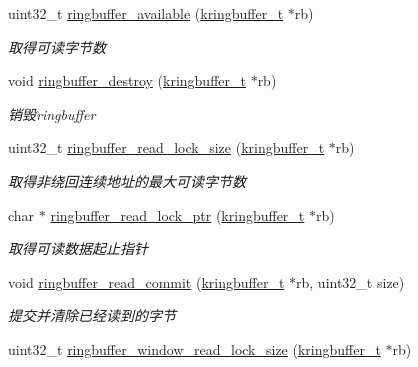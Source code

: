 \begin{DoxyCompactItemize}
uint32\+\_\+t \hyperlink{a00091_aecd5c166ce42982ee434172cc555787d_aecd5c166ce42982ee434172cc555787d}{ringbuffer\+\_\+available} (\hyperlink{a00056_a66d91f7667db1f0b2983fc25e1a20f1c_a66d91f7667db1f0b2983fc25e1a20f1c}{kringbuffer\+\_\+t} $\ast$rb)
\begin{DoxyCompactList}\small\item\em 取得可读字节数 \end{DoxyCompactList}\item 
void \hyperlink{a00091_aa6135df0cc9bc827cae301626898dace_aa6135df0cc9bc827cae301626898dace}{ringbuffer\+\_\+destroy} (\hyperlink{a00056_a66d91f7667db1f0b2983fc25e1a20f1c_a66d91f7667db1f0b2983fc25e1a20f1c}{kringbuffer\+\_\+t} $\ast$rb)
\begin{DoxyCompactList}\small\item\em 销毁ringbuffer \end{DoxyCompactList}\item 
uint32\+\_\+t \hyperlink{a00091_a4bd33ec2ce3cba490a6166c5eac88f5c_a4bd33ec2ce3cba490a6166c5eac88f5c}{ringbuffer\+\_\+read\+\_\+lock\+\_\+size} (\hyperlink{a00056_a66d91f7667db1f0b2983fc25e1a20f1c_a66d91f7667db1f0b2983fc25e1a20f1c}{kringbuffer\+\_\+t} $\ast$rb)
\begin{DoxyCompactList}\small\item\em 取得非绕回连续地址的最大可读字节数 \end{DoxyCompactList}\item 
char $\ast$ \hyperlink{a00091_a51fd16b89396cbe6a3e4cf3d41b4dda5_a51fd16b89396cbe6a3e4cf3d41b4dda5}{ringbuffer\+\_\+read\+\_\+lock\+\_\+ptr} (\hyperlink{a00056_a66d91f7667db1f0b2983fc25e1a20f1c_a66d91f7667db1f0b2983fc25e1a20f1c}{kringbuffer\+\_\+t} $\ast$rb)
\begin{DoxyCompactList}\small\item\em 取得可读数据起止指针 \end{DoxyCompactList}\item 
void \hyperlink{a00091_a5d0caeccb61acafaa4c5148b697dd927_a5d0caeccb61acafaa4c5148b697dd927}{ringbuffer\+\_\+read\+\_\+commit} (\hyperlink{a00056_a66d91f7667db1f0b2983fc25e1a20f1c_a66d91f7667db1f0b2983fc25e1a20f1c}{kringbuffer\+\_\+t} $\ast$rb, uint32\+\_\+t size)
\begin{DoxyCompactList}\small\item\em 提交并清除已经读到的字节 \end{DoxyCompactList}\item 
uint32\+\_\+t \hyperlink{a00091_ae50358352ded17ea670e926a59250cd0_ae50358352ded17ea670e926a59250cd0}{ringbuffer\+\_\+window\+\_\+read\+\_\+lock\+\_\+size} (\hyperlink{a00056_a66d91f7667db1f0b2983fc25e1a20f1c_a66d91f7667db1f0b2983fc25e1a20f1c}{kringbuffer\+\_\+t} $\ast$rb)

\end{DoxyCompactItemize}
